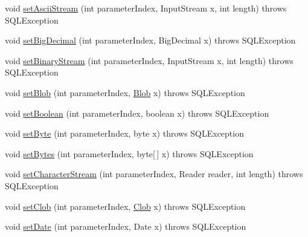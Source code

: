 \begin{DoxyCompactItemize}
\item 
void \mbox{\hyperlink{classcom_1_1mysql_1_1jdbc_1_1_server_prepared_statement_a4f9bda77a0fd70b7bfe3b6ff71aab74d}{set\+Ascii\+Stream}} (int parameter\+Index, Input\+Stream x, int length)  throws S\+Q\+L\+Exception 
\item 
void \mbox{\hyperlink{classcom_1_1mysql_1_1jdbc_1_1_server_prepared_statement_a4ebc09b4d7c11864da98aaa889cdaa93}{set\+Big\+Decimal}} (int parameter\+Index, Big\+Decimal x)  throws S\+Q\+L\+Exception 
\item 
void \mbox{\hyperlink{classcom_1_1mysql_1_1jdbc_1_1_server_prepared_statement_a7b5f9403670d9b795ba1a1e269d3ef2a}{set\+Binary\+Stream}} (int parameter\+Index, Input\+Stream x, int length)  throws S\+Q\+L\+Exception 
\item 
void \mbox{\hyperlink{classcom_1_1mysql_1_1jdbc_1_1_server_prepared_statement_ac1ab0464fd52487c1de67189168331da}{set\+Blob}} (int parameter\+Index, \mbox{\hyperlink{classcom_1_1mysql_1_1jdbc_1_1_blob}{Blob}} x)  throws S\+Q\+L\+Exception 
\item 
void \mbox{\hyperlink{classcom_1_1mysql_1_1jdbc_1_1_server_prepared_statement_acabde4bf63d0f89240be8697087931c8}{set\+Boolean}} (int parameter\+Index, boolean x)  throws S\+Q\+L\+Exception 
\item 
void \mbox{\hyperlink{classcom_1_1mysql_1_1jdbc_1_1_server_prepared_statement_aef5f55eba055a0061bef34a3a7bef005}{set\+Byte}} (int parameter\+Index, byte x)  throws S\+Q\+L\+Exception 
\item 
void \mbox{\hyperlink{classcom_1_1mysql_1_1jdbc_1_1_server_prepared_statement_a5cedc06238d893f25f948137c182c1ba}{set\+Bytes}} (int parameter\+Index, byte\mbox{[}$\,$\mbox{]} x)  throws S\+Q\+L\+Exception 
\item 
void \mbox{\hyperlink{classcom_1_1mysql_1_1jdbc_1_1_server_prepared_statement_af6753dd61ca0bdea3e4af6cf607a171d}{set\+Character\+Stream}} (int parameter\+Index, Reader reader, int length)  throws S\+Q\+L\+Exception 
\item 
void \mbox{\hyperlink{classcom_1_1mysql_1_1jdbc_1_1_server_prepared_statement_a2f04b85d3ca2ff2d58eb7eb6f45d4381}{set\+Clob}} (int parameter\+Index, \mbox{\hyperlink{classcom_1_1mysql_1_1jdbc_1_1_clob}{Clob}} x)  throws S\+Q\+L\+Exception 
\item 
void \mbox{\hyperlink{classcom_1_1mysql_1_1jdbc_1_1_server_prepared_statement_a3a7581eb6cf9b5e8421a9b2c9843eae1}{set\+Date}} (int parameter\+Index, Date x)  throws S\+Q\+L\+Exception 
\item 

\end{DoxyCompactItemize}
